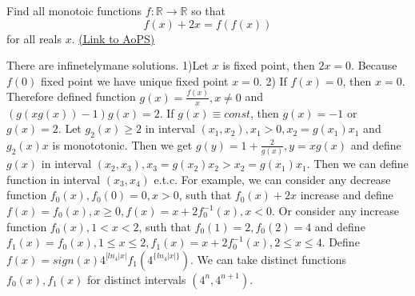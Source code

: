 \begin{problem}
	Find all monotoic functions $f: \mathbb R \to \mathbb R$ so that \[ f(x) + 2x = f(f(x))\] for all reals $x$.
	\flushright \href{https://artofproblemsolving.com/community/c6h282499}{(Link to AoPS)}
\end{problem}



\begin{solution}
	There are infinetelymane solutions.
1)Let $ x$ is fixed point, then $ 2x = 0$. Because $ f(0)$ fixed point we have unique fixed point $ x = 0$.
2) If $ f(x) = 0$, then $ x = 0$. Therefore defined function $ g(x) = \frac {f(x)}{x}, x\not = 0$ and $ (g(xg(x)) - 1)g(x) = 2$.
If $ g(x)\equiv const$, then $ g(x) = - 1$ or $ g(x) = 2$.
Let $ g_2(x)\ge 2$ in interval $ (x_1,x_2), x_1 > 0, x_2 = g(x_1)x_1$ and $ g_2(x)x$ is monototonic. Then we get
$ g(y) = 1 + \frac {2}{g(x)},y = xg(x)$ and define $ g(x)$ in interval $ (x_2,x_3),x_3 = g(x_2)x_2 > x_2 = g(x_1)x_1$.
Then we can define function in interval $ (x_3,x_4)$ e.t.c.
For example, we can consider any decrease function $ f_0(x),f_0(0)=0,x>0$, suth that $ f_0(x)+2x$ increase
and define $ f(x)=f_0(x),x\ge 0, f(x)=x+2f_0^{-1}(x),x<0$.
Or consider any increase function $ f_0(x), 1<x<2$, suth that $ f_0(1)=2, f_0(2)=4$ and define
$ f_1(x)=f_0(x), 1\le x\le 2, f_1(x)=x+2f_0^{-1}(x), 2\le x\le 4$.
Define $ f(x)=sign(x) 4^{[ln_4|x|}f_1(4^{\{ln_4|x|\}})$. We can take distinct functions $ f_0(x),f_1(x)$ for distinct intervals $ (4^n,4^{n+1})$.
\end{solution}



